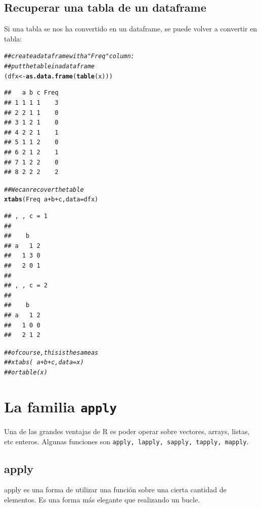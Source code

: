 \documentclass{config/apuntes}\usepackage[]{graphicx}\usepackage[]{xcolor}
\makeatletter
\newcommand{\hlcom}[1]{\textcolor[rgb]{0.678,0.584,0.686}{\textit{#1}}}%
\newcommand{\hlopt}[1]{\textcolor[rgb]{0,0,0}{#1}}%
\newcommand{\hldef}[1]{\textcolor[rgb]{0.345,0.345,0.345}{#1}}%
\newcommand{\hlkwb}[1]{\textcolor[rgb]{0.69,0.353,0.396}{#1}}%
\newcommand{\hlkwc}[1]{\textcolor[rgb]{0.333,0.667,0.333}{#1}}%
\newcommand{\hlkwd}[1]{\textcolor[rgb]{0.737,0.353,0.396}{\textbf{#1}}}%
\newenvironment{kframe}{%
 \def\at@end@of@kframe{}%
 \ifinner\ifhmode%
  \def\at@end@of@kframe{\end{minipage}}%
  \begin{minipage}{\columnwidth}%
 \fi\fi%
 \def\FrameCommand##1{\hskip\@totalleftmargin \hskip-\fboxsep
 \colorbox{shadecolor}{##1}\hskip-\fboxsep
     \hskip-\linewidth \hskip-\@totalleftmargin \hskip\columnwidth}%
 \MakeFramed {\advance\hsize-\width
   \@totalleftmargin\z@ \linewidth\hsize
   \@setminipage}}%
 {\par\unskip\endMakeFramed%
 \at@end@of@kframe}
\newenvironment{knitrout}{}{} %
\newcommand{\code}[1]{\texttt{#1}}
\makeatother
\begin{document}
\section{Recuperar una tabla de un dataframe}
Si una tabla se nos ha convertido en un dataframe, se puede volver a convertir en tabla:

\begin{knitrout}
\color{fgcolor}\begin{kframe}
\begin{alltt}
\hlcom{## create a data frame with a "Freq" column:}
\hlcom{## put the table in a data frame}
\hldef{(dfx} \hlkwb{<-} \hlkwd{as.data.frame}\hldef{(}\hlkwd{table}\hldef{(x)))}
\end{alltt}
\begin{verbatim}
##   a b c Freq
## 1 1 1 1    3
## 2 2 1 1    0
## 3 1 2 1    0
## 4 2 2 1    1
## 5 1 1 2    0
## 6 2 1 2    1
## 7 1 2 2    0
## 8 2 2 2    2
\end{verbatim}
\begin{alltt}
\hlcom{## We can recover the table}
\hlkwd{xtabs}\hldef{(Freq} \hlopt{~} \hldef{a} \hlopt{+} \hldef{b} \hlopt{+} \hldef{c,} \hlkwc{data} \hldef{= dfx)}
\end{alltt}
\begin{verbatim}
## , , c = 1
## 
##    b
## a   1 2
##   1 3 0
##   2 0 1
## 
## , , c = 2
## 
##    b
## a   1 2
##   1 0 0
##   2 1 2
\end{verbatim}
\begin{alltt}
\hlcom{## of course, this is the same as}
\hlcom{## xtabs(~ a + b + c, data = x)}
\hlcom{## or table(x)}
\end{alltt}
\end{kframe}
\end{knitrout}

\chapter{La familia \code{apply}}
Una de las grandes ventajas de R es poder operar sobre vectores, arrays, listas, etc enteros. Algunas funciones son \code{apply, lapply, sapply, tapply, mapply}. 

\section{apply}
apply es una forma de utilizar una función sobre una cierta cantidad de elementos. Es una forma más elegante que realizando un bucle. 
\end{document}
